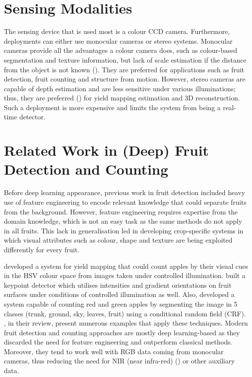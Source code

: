 \section{Sensing Modalities}
The sensing device that is used most is a colour CCD camera. Furthermore, deployments can either use monocular cameras or stereo systems. Monocular cameras provide all the advantages a colour camera does, such as colour-based segmentation and texture information, but lack of scale estimation if the distance from the object is not known (\cite{gongal2015sensors}). They are preferred for applications such as fruit detection, fruit counting and structure from motion. However, stereo cameras are capable of depth estimation and are less sensitive under various illuminations; thus, they are preferred (\cite{wang2016localisation}) for yield mapping estimation and 3D reconstruction. Such a deployment is more expensive and limits the system from being a real-time detector.

\section{Related Work in (Deep) Fruit Detection and Counting}
Before deep learning appearance, previous work in fruit detection included heavy use of feature engineering to encode relevant knowledge that could separate fruits from the background. However, feature engineering requires expertise from the domain knowledge, which is not an easy task as the same methods do not apply in all fruits. This lack in generalisation led in developing crop-specific systems in which visual attributes such as colour, shape and texture are being exploited differently for every fruit.

\cite{wang2013automated} developed a system for yield mapping that could count apples by their visual cues in the HSV colour space from images taken under controlled illumination. \cite{pothen2016texture} built a keypoint detector which utilises intensities and gradient orientations on fruit surfaces under conditions of controlled illumination as well. Also, \cite{hung2015feature} developed a system capable of counting red and green apples by segmenting the image in 5 classes (trunk, ground, sky, leaves, fruit) using a conditional random field (CRF). \cite{gongal2015sensors}, in their review, present numerous examples that apply these techniques. Modern fruit detection and counting approaches are mostly deep learning-based as they discarded the need for feature engineering and outperform classical methods. Moreover, they tend to work well with RGB data coming from monocular cameras, thus reducing the need for NIR (near infra-red) (\cite{hung2013orchard}) or other auxiliary data.

